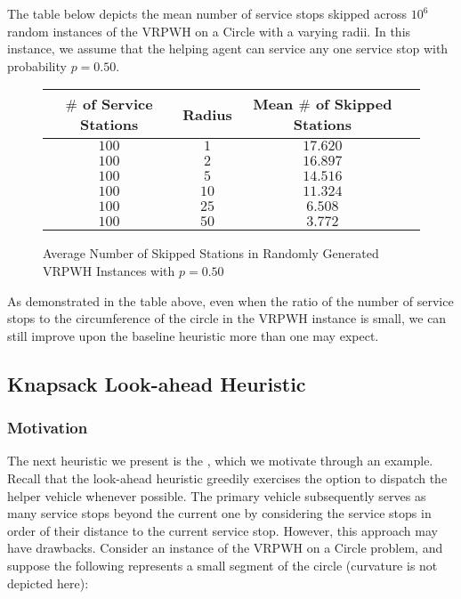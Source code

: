 \documentclass[12pt]{scrartcl}
\begin{document}
\noindent The table below depicts the mean number of service stops skipped across $10^{6}$ random instances of the VRPWH on a Circle with a varying radii. In this instance, we assume that the helping agent can service any one service stop with probability $p = 0.50$.


\begin{figure}[H]
\centering
\begin{tabular}{ |c|c|c||c| } 
 \hline
 $\#$ of Service Stations & Radius & Mean $\#$ of Skipped Stations \\
 \hline
 $100$ & $1$ & $17.620$ \\ 
 \hline
 $100$ & $2$ & $16.897$ \\ 
 \hline
 $100$ & $5$ & $14.516$ \\
 \hline
 $100$ & $10$ & $11.324$ \\
 \hline
 $100$ & $25$ & $6.508$ \\
 \hline
 $100$ & $50$ & $3.772$ \\
 \hline
\end{tabular}
\caption{Average Number of Skipped Stations in Randomly Generated VRPWH Instances with $p = 0.50$}
\end{figure}

As demonstrated in the table above, even when the ratio of the number of service stops to the circumference of the circle in the VRPWH instance is small, we can still improve upon the baseline heuristic more than one may expect.

\subsection{Knapsack Look-ahead Heuristic}
\subsubsection{Motivation}

The next heuristic we present is the , which we motivate through an example. \\ 

Recall that the look-ahead heuristic greedily exercises the option to dispatch the helper vehicle whenever possible. The primary vehicle subsequently serves as many service stops beyond the current one by considering the service stops in order of their distance to the current service stop. However, this approach may have drawbacks. Consider an instance of the VRPWH on a Circle problem, and suppose the following represents a small segment of the circle (curvature is not depicted here): 
\end{document}
